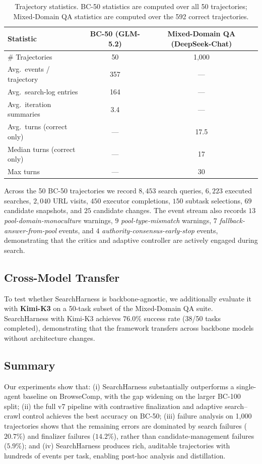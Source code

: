 \begin{table}[t]
  \centering
  \small
  \begin{tabular}{lcc}
    \toprule
    Statistic & BC-50 (GLM-5.2) & Mixed-Domain QA (DeepSeek-Chat) \\
    \midrule
    \# Trajectories            & 50   & 1{,}000 \\
    Avg.\ events / trajectory  & 357  & --- \\
    Avg.\ search-log entries   & 164  & --- \\
    Avg.\ iteration summaries  & 3.4  & --- \\
    Avg.\ turns (correct only) & ---  & 17.5 \\
    Median turns (correct only)& ---  & 17 \\
    Max turns                  & ---  & 30 \\
    \bottomrule
  \end{tabular}
  \caption{Trajectory statistics. BC-50 statistics are computed over all 50 trajectories; Mixed-Domain QA statistics are computed over the 592 correct trajectories.}
  \label{tab:exp:traj}
\end{table}

Across the 50 BC-50 trajectories we record $8{,}453$ search queries, $6{,}223$ executed searches, $2{,}040$ URL visits, $450$ executor completions, $150$ subtask selections, $69$ candidate snapshots, and $25$ candidate changes.
The event stream also records $13$ \emph{pool-domain-monoculture} warnings, $9$ \emph{pool-type-mismatch} warnings, $7$ \emph{fallback-answer-from-pool} events, and $4$ \emph{authority-consensus-early-stop} events, demonstrating that the critics and adaptive controller are actively engaged during search.

\subsection{Cross-Model Transfer}
\label{sec:exp:transfer}

To test whether SearchHarness is backbone-agnostic, we additionally evaluate it with \textbf{Kimi-K3} on a 50-task subset of the Mixed-Domain QA suite.
SearchHarness with Kimi-K3 achieves $76.0\%$ success rate (38/50 tasks completed), demonstrating that the framework transfers across backbone models without architecture changes.

\subsection{Summary}
\label{sec:exp:summary}

Our experiments show that:
(i) SearchHarness substantially outperforms a single-agent baseline on BrowseComp, with the gap widening on the larger BC-100 split;
(ii) the full v7 pipeline with contrastive finalization and adaptive search--crawl control achieves the best accuracy on BC-50;
(iii) failure analysis on 1{,}000 trajectories shows that the remaining errors are dominated by search failures ($20.7\%$) and finalizer failures ($14.2\%$), rather than candidate-management failures ($5.9\%$); and
(iv) SearchHarness produces rich, auditable trajectories with hundreds of events per task, enabling post-hoc analysis and distillation.
